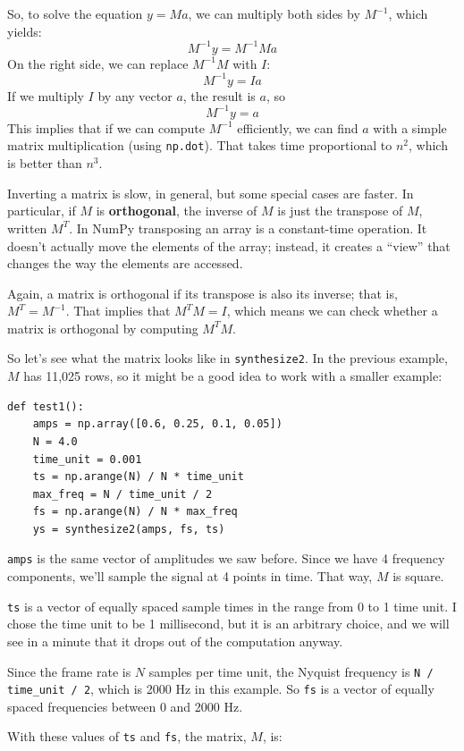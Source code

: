 \documentclass[12pt]{book}
\begin{document}
So, to solve the equation $y = Ma$, we can multiply both sides by
$M^{-1}$, which yields:
%
\[ M^{-1}y = M^{-1} M a \]
%
On the right side, we can replace $M^{-1}M$ with $I$:
%
\[ M^{-1}y = I a \]
%
If we multiply $I$ by any vector $a$, the result is $a$, so  
%
\[ M^{-1}y = a \]
%
This implies that if we can compute $M^{-1}$ efficiently, we can find
$a$ with a simple matrix multiplication (using {\tt np.dot}).  That
takes time proportional to $n^2$, which is better than $n^3$.

Inverting a matrix is slow, in general, but some special cases are
faster.  In particular, if $M$ is {\bf orthogonal}, the inverse of $M$
is just the transpose of $M$, written $M^T$.  In NumPy
transposing an array is a constant-time operation.  It
doesn't actually move the elements of the array; instead, it creates a
``view'' that changes the way the elements are accessed.

Again, a matrix is orthogonal if its transpose is also its inverse;
that is, $M^T = M^{-1}$.  That implies that $M^TM = I$, which means we
can check whether a matrix is orthogonal by computing $M^TM$.

So let's see what the matrix looks like in {\tt synthesize2}.  In 
the previous example, $M$ has 11,025 rows, so it might be a good idea
to work with a smaller example:

\begin{verbatim}
def test1():
    amps = np.array([0.6, 0.25, 0.1, 0.05])
    N = 4.0
    time_unit = 0.001
    ts = np.arange(N) / N * time_unit
    max_freq = N / time_unit / 2
    fs = np.arange(N) / N * max_freq
    ys = synthesize2(amps, fs, ts)
\end{verbatim}

{\tt amps} is the same vector of amplitudes we saw before.
Since we have 4 frequency components, we'll sample the signal
at 4 points in time.  That way, $M$ is square.

{\tt ts} is a vector of equally spaced sample times in the range from
0 to 1 time unit.  I chose the time unit to be 1 millisecond, but it
is an arbitrary choice, and we will see in a minute that it drops out
of the computation anyway.

Since the frame rate is $N$ samples per time unit, the Nyquist
frequency is \verb"N / time_unit / 2", which is 2000 Hz in this
example.  So {\tt fs} is a vector of equally spaced frequencies
between 0 and 2000 Hz.

With these values of {\tt ts} and {\tt fs}, the matrix, $M$, is:
\end{document}
